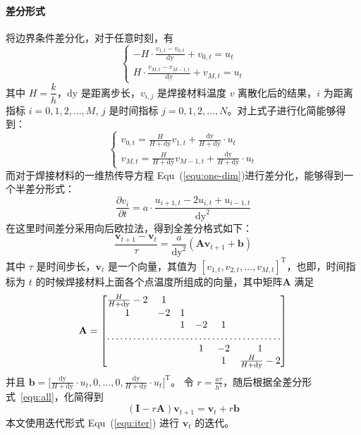 \documentclass[../main.tex]{subfiles}
\begin{document}
\paragraph{差分形式}
将边界条件差分化，对于任意时刻，有
\begin{equation}
\begin{cases}
\displaystyle - H \cdot \frac{v _{1, t}  - v _{0, t}}{\mathrm{dy}} + v_{0 ,t} = u_{t} \\
\displaystyle H \cdot\frac{v_{M , t} - v _{M-1, t}}{\mathrm{dy}} + v_{M,t} = u_{t}
\end{cases}
\end{equation}
其中 \(H = \dfrac{k}{h}\)，\(\mathrm{dy}\) 是距离步长，\(v_{i,j}\) 是焊接材料温度 \(v\) 离散化后的结果，\(i\) 为距离指标 \(i = 0,  1,  2 , \dots , M\), \(j\) 是时间指标 \(j = 0 , 1 , 2 , \dots, N\)。对上式子进行化简能够得到：
\begin{equation}
\begin{cases}
\displaystyle v_{0,t} = \frac{H}{H + \mathrm{dy}} v_{1 ,t} + \frac{\mathrm{dy}}{H + \mathrm{dy}} \cdot u_{t}\\
\displaystyle v_{M,t} = \frac{H}{H + \mathrm{dy}} v _{M-1, t} + \frac{\mathrm{dy}}{H + \mathrm{dy}} \cdot u_{t}
\end{cases}
\end{equation}
而对于焊接材料的一维热传导方程 Equ~(\ref{equ:one-dim})进行差分化，能够得到一个半差分形式：
\begin{equation}
\frac{\partial v _{i}}{\partial t} = a \cdot \frac{u_{i+1, t} - 2 u_{i, t} + u_{i- 1 , t}}{\mathrm{dy} ^{2}}
\end{equation}
在这里时间差分采用向后欧拉法，得到全差分格式如下：
\begin{equation}\label{equ:all}
\frac{\mathbf{v}_{t+1}  - \mathbf{v}_{t}}{\tau}= \frac{a}{\mathrm{dy}^{2}} (\mathbf{A}\mathbf{v} _{t+1} + \mathbf{b})
\end{equation}
其中 \(\tau\) 是时间步长，\(\mathbf{v}_{t}\) 是一个向量，其值为 \([v _{1, t}, v_{2, t}, \dots, v_{M, t}]^{\mathrm{T}}\)，也即，时间指标为 \(t\) 的时候焊接材料上面各个点温度所组成的向量，其中矩阵\(\mathbf A\) 满足
\begin{equation}
\mathbf{A} =
\begin{bmatrix}
\frac{H}{H + \mathrm{dy}} - 2 & 1 &&\\
1 & -2 & 1 &\\
& & 1 & -2 & 1 \\
\hdotsfor{6}\\
&& & 1 & -2 & 1 \\
&& &  & 1 &\frac{H}{H + \mathrm{dy}} -2
\end{bmatrix}
\end{equation}
并且 \(\mathbf{b} = \displaystyle \bigg[ \frac{\mathrm{dy}}{H + \mathrm{dy}} \cdot u_{t} , 0 ,\dots, 0 , \frac{\mathrm{dy}}{H + \mathrm{dy}} \cdot u_{t} \bigg] ^{\mathrm{T}}\)。
令 \(r = \displaystyle \frac{a \tau}{h ^{2}}\)，随后根据全差分形式~\ref{equ:all}，化简得到
\begin{equation}\label{equ:iter}
(\mathbf{I} - r\mathbf{A} ) \mathbf{v} _{t+1} = \mathbf{v}_{t} + r \mathbf{b}
\end{equation}
本文使用迭代形式 Equ~(\ref{equ:iter}) 进行 \(\mathbf{v}_{t}\) 的迭代。
\end{document}
